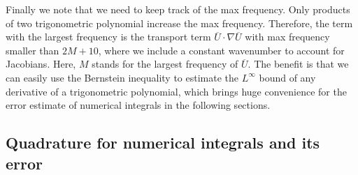 \documentclass[11pt,a4paper]{article}
\numberwithin{equation}{section}
\newcommand{\cdummy}{\cdot}
\begin{document}
Finally we note that we need to keep track of the max
frequency. Only products of two trigonometric polynomial increase the max
frequency. Therefore, the term with the largest frequency is the transport term
$\overline{U} \cdummy \nabla \overline{U}$ with max frequency smaller than $2
M + 10$, where we include a constant wavenumber to account for Jacobians.  Here, $M$ stands for the largest frequency of $\overline{U}$.
The benefit is that we can easily use the Bernstein inequality to estimate the
$L^{\infty}$ bound of any derivative of a trigonometric polynomial, which
brings huge convenience for the error estimate of numerical integrals in the
following sections.


\subsection{Quadrature for numerical integrals and its error}\label{subsec:Quadrature}
\end{document}
